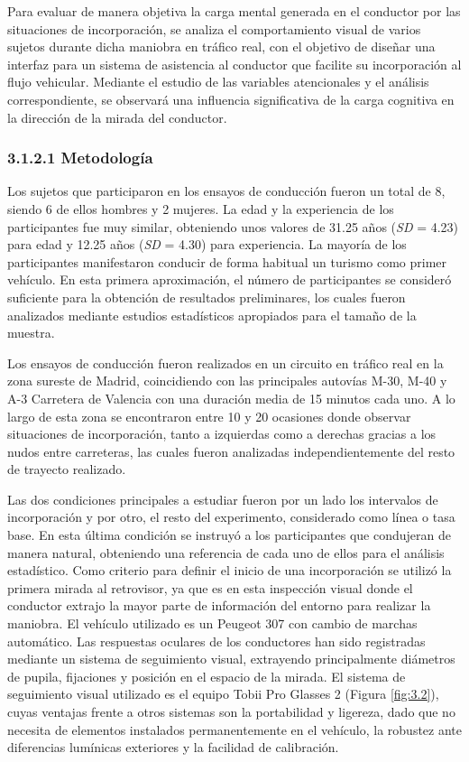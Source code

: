 Para evaluar de manera objetiva la carga mental generada en el conductor por las situaciones de incorporación, se analiza el comportamiento visual de varios sujetos durante dicha maniobra en tráfico real, con el objetivo de diseñar una interfaz para un sistema de asistencia al conductor que facilite su incorporación al flujo vehicular. Mediante el estudio de las variables atencionales y el análisis correspondiente, se observará una influencia significativa de la carga cognitiva en la dirección de la mirada del conductor.

\subsubsection{3.1.2.1 Metodología}\label{3121}

Los sujetos que participaron en los ensayos de conducción fueron un total de 8, siendo 6 de ellos hombres y 2 mujeres. La edad y la experiencia de los participantes fue muy similar, obteniendo unos valores de 31.25 años (\emph{SD} = 4.23) para edad y 12.25 años (\emph{SD} = 4.30) para experiencia. La mayoría de los participantes manifestaron conducir de forma habitual un turismo como primer vehículo. En esta primera aproximación, el número de participantes se consideró suficiente para la obtención de resultados preliminares, los cuales fueron analizados mediante estudios estadísticos apropiados para el tamaño de la muestra. 

Los ensayos de conducción fueron realizados en un circuito en tráfico real en la zona sureste de Madrid, coincidiendo con las principales autovías M-30, M-40 y A-3 Carretera de Valencia con una duración media de 15 minutos cada uno. A lo largo de esta zona se encontraron entre 10 y 20 ocasiones donde observar situaciones de incorporación, tanto a izquierdas como a derechas gracias a los nudos entre carreteras, las cuales fueron analizadas independientemente del resto de trayecto realizado.  

Las dos condiciones principales a estudiar fueron por un lado los intervalos de incorporación y por otro, el resto del experimento, considerado como línea o tasa base. En esta última condición se instruyó a los participantes que condujeran de manera natural, obteniendo una referencia de cada uno de ellos para el análisis estadístico. Como criterio para definir el inicio de una incorporación se utilizó la primera mirada al retrovisor, ya que es en esta inspección visual donde el conductor extrajo la mayor parte de información del entorno para realizar la maniobra. El vehículo utilizado es un Peugeot 307 con cambio de marchas automático. Las respuestas oculares de los conductores han sido registradas mediante un sistema de seguimiento visual, extrayendo principalmente diámetros de pupila, fijaciones y posición en el espacio de la mirada.  
El sistema de seguimiento visual utilizado es el equipo Tobii Pro Glasses 2 (Figura \ref{fig:3.2}), cuyas ventajas frente a otros sistemas son la portabilidad y ligereza, dado que no necesita de elementos instalados permanentemente en el vehículo, la robustez ante diferencias lumínicas exteriores y la facilidad de calibración. 

